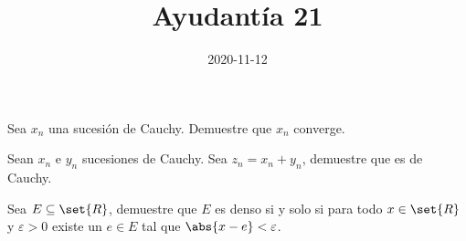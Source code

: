 \documentclass{ayudantia}
\title{Ayudantía 21}
\date{2020-11-12}
\begin{document}
\maketitle

\begin{prob}
    Sea \(x_n\) una sucesión de Cauchy. Demuestre que \(x_n\) converge.
\end{prob}

\begin{ans}
    \begin{sol}

    \end{sol}
\end{ans}



\begin{prob}
    Sean \(x_n\) e \(y_n\) sucesiones de Cauchy. Sea \(z_n=x_n+y_n\), demuestre que es de Cauchy.
\end{prob}

\begin{ans}
    \begin{sol}

    \end{sol}
\end{ans}



\begin{prob}
    Sea \(E\subseteq\set{R}\), demuestre que \(E\) es denso si y solo si para todo \(x\in\set{R}\) y \(\varepsilon>0\) existe un \(e\in E\) tal que \(\abs{x-e}<\varepsilon\).
\end{prob}

\begin{ans}
    \begin{sol}

    \end{sol}
\end{ans}
\end{document}
